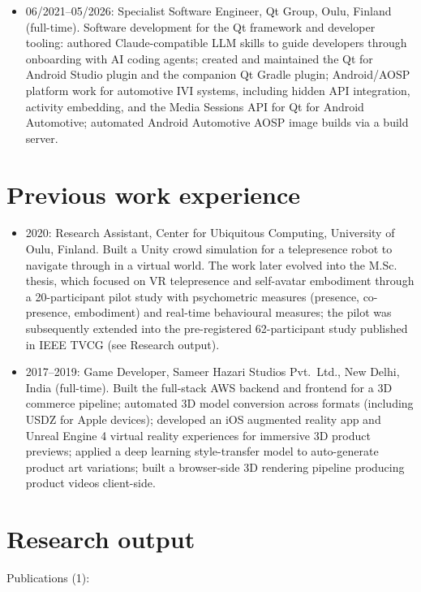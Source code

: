 \documentclass[a4paper,12pt]{article}
\begin{document}
\begin{itemize}
    \item 06/2021--05/2026: Specialist Software Engineer, Qt Group, Oulu, Finland (full-time). Software development for the Qt framework and developer tooling: authored Claude-compatible LLM skills to guide developers through onboarding with AI coding agents; created and maintained the Qt for Android Studio plugin and the companion Qt Gradle plugin; Android/AOSP platform work for automotive IVI systems, including hidden API integration, activity embedding, and the Media Sessions API for Qt for Android Automotive; automated Android Automotive AOSP image builds via a build server.
\end{itemize}

\section*{Previous work experience}

\begin{itemize}
    \item 2020: Research Assistant, Center for Ubiquitous Computing, University of Oulu, Finland. Built a Unity crowd simulation for a telepresence robot to navigate through in a virtual world. The work later evolved into the M.Sc. thesis, which focused on VR telepresence and self-avatar embodiment through a 20-participant pilot study with psychometric measures (presence, co-presence, embodiment) and real-time behavioural measures; the pilot was subsequently extended into the pre-registered 62-participant study published in IEEE TVCG (see Research output).
    \item 2017--2019: Game Developer, Sameer Hazari Studios Pvt.\ Ltd., New Delhi, India (full-time). Built the full-stack AWS backend and frontend for a 3D commerce pipeline; automated 3D model conversion across formats (including USDZ for Apple devices); developed an iOS augmented reality app and Unreal Engine 4 virtual reality experiences for immersive 3D product previews; applied a deep learning style-transfer model to auto-generate product art variations; built a browser-side 3D rendering pipeline producing product videos client-side.
\end{itemize}

\newpage
\section*{Research output}

Publications (1):
\end{document}

